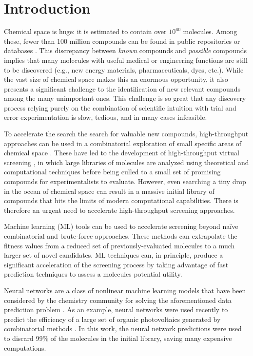\section{Introduction}

Chemical space is huge: it is estimated to contain over $10^{60}$ molecules. Among these, fewer than 100 million compounds can be found in public repositories or databases \cite{Reymond_2012}. This discrepancy between \textit{known} compounds and \textit{possible} compounds implies that many molecules with useful medical or engineering functions are still to be discovered (e.g., new energy materials, pharmaceuticals, dyes, etc.). While the vast size of chemical space makes this an enormous opportunity, it also presents a significant challenge to the identification of new relevant compounds among the many unimportant ones.  This challenge is so great that any discovery process relying purely on the combination of scientific intuition with trial and error experimentation is slow, tedious, and in many cases infeasible.

To accelerate the search the search for valuable new compounds, high-throughput approaches can be used in a combinatorial exploration of small specific areas of chemical space \cite{Rajan_2008}. These have led to the development of high-throughput virtual screening \cite{Pyzer_Knapp_2015,Halls_2010,Curtarolo_2013,Husch_2015,Subramaniam_2008,Shoichet_2004,Jain_2013,G_mez_Bombarelli_2016}, in which large libraries of molecules are analyzed using theoretical and computational techniques before being culled to a small set of promising compounds for experimentalists to evaluate. However, even searching a tiny drop in the ocean of chemical space can result in a massive initial library of compounds that hits the limits of modern computational capabilities. There is therefore an urgent need to accelerate high-throughput screening approaches.

Machine learning (ML) tools can be used to accelerate screening beyond na\"{i}ve combinatorial and brute-force approaches. These methods can extrapolate the fitness values from a reduced set of previously-evaluated molecules to a much larger set of novel candidates.  ML techniques can, in principle, produce a significant acceleration of the screening process by taking advantage of fast prediction techniques to assess a molecules potential utility.

Neural networks are a class of nonlinear machine learning models that have been considered by the chemistry community for solving the aforementioned data prediction problem \cite{Zupan_1991,Burden_1996,Rodemerck_2004,Myint_2012,DuvMacetal15nfp}. As an example, neural networks  were used
recently to predict the efficiency of a large set of organic photovoltaics generated by combinatorial methods \cite{Pyzer_Knapp_2015a}. In this work, the neural network predictions were used to discard 99\% of the molecules in the initial library, saving many expensive computations.

